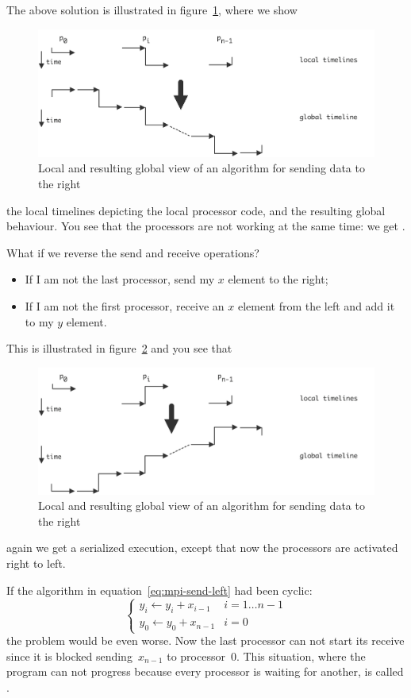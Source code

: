 The above solution is illustrated in figure~\ref{fig:wave_right_1},
where we show
\begin{figure}
  \includegraphics[scale=.14]{graphics/wave_right_1}
  \caption{Local and resulting global view of an algorithm for sending
    data to the right}
  \label{fig:wave_right_1}
\end{figure}
the local timelines depicting the local processor code, and the resulting
global behaviour. You see that the processors are not working at the
same time: we get .

What if we reverse the send and receive operations?
\begin{itemize}
\item If I am not the last processor, send my $x$ element to the
  right;
\item If I am not the first processor, receive an $x$ element from the
  left and add it to my $y$ element.
\end{itemize}
This is illustrated in figure~\ref{fig:wave_right_2} and you see that
\begin{figure}
  \includegraphics[scale=.14]{graphics/wave_right_2}
  \caption{Local and resulting global view of an algorithm for sending
    data to the right}
  \label{fig:wave_right_2}
\end{figure}
again we get a serialized execution, except that now the processors are
activated right to left.

If the algorithm in equation~\ref{eq:mpi-send-left} had been cyclic:
\begin{equation}
\begin{cases}
y_i\leftarrow y_i+x_{i-1}&i=1\ldots n-1\\ 
y_0\leftarrow y_0+x_{n-1}&i=0
\end{cases}
\label{eq:cyclic-add}
\end{equation}
the problem would be even worse. Now the last processor can not start
its receive since it is blocked sending~$x_{n-1}$ to processor~0. This
situation, where the program can not progress because every processor is
waiting for another, is called . 

